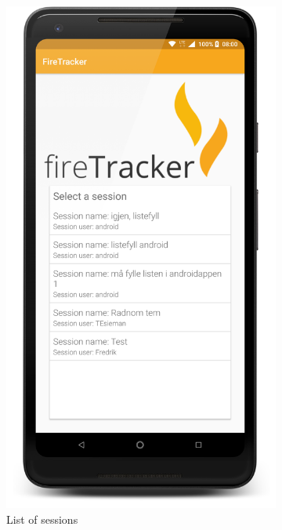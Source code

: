 \documentclass[../Main/thesis.tex]{subfiles}
\begin{document}
\begin{figure}[h]
	\centering
	\begin{subfigure}{0.2\textwidth}
		\includegraphics[width=\textwidth]{../fig/firetracker_app_old_1}
		\caption{List of sessions}
		\label{fig:app-first-prototype-sessionlist}
	\end{subfigure}
	\begin{subfigure}{0.2\textwidth}

\end{subfigure}
\end{figure}
\end{document}
